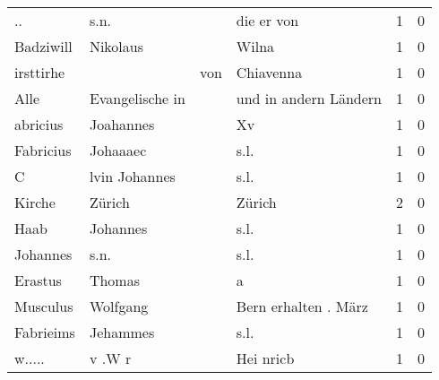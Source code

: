 \begin{center}
\begin{tiny}
\begin{longtabu}{llllrr}
                       .. &                               s.n. &             &                                  die er von &          1 &         0 \\
                Badziwill &                           Nikolaus &             &                                       Wilna &          1 &         0 \\
                irsttirhe &                                    &         von &                                   Chiavenna &          1 &         0 \\
                     Alle &                    Evangelische in &             &                       und in andern Ländern &          1 &         0 \\
                 abricius &                          Joahannes &             &                                          Xv &          1 &         0 \\
                Fabricius &                           Johaaaec &             &                                        s.l. &          1 &         0 \\
                        C &                      lvin Johannes &             &                                        s.l. &          1 &         0 \\
                   Kirche &                             Zürich &             &                                      Zürich &          2 &         0 \\
                     Haab &                           Johannes &             &                                        s.l. &          1 &         0 \\
                 Johannes &                               s.n. &             &                                        s.l. &          1 &         0 \\
                  Erastus &                             Thomas &             &                                           a &          1 &         0 \\
                 Musculus &                           Wolfgang &             &                        Bern erhalten . März &          1 &         0 \\
                Fabrieims &                           Jehammes &             &                                        s.l. &          1 &         0 \\
                   w..... &                             v .W r &             &                                   Hei nricb &          1 &         0 \\

\end{longtabu}
\end{tiny}
\end{center}
